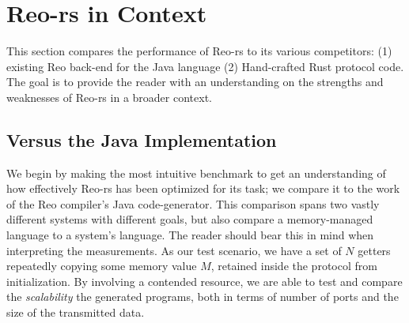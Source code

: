 \section{Reo-rs in Context}
This section compares the performance of Reo-rs to its various competitors: (1) existing Reo back-end for the Java language (2) Hand-crafted Rust protocol code. The goal is to provide the reader with an understanding on the strengths and weaknesses of Reo-rs in a broader context.

\subsection{Versus the Java Implementation}
We begin by making the most intuitive benchmark to get an understanding of how effectively Reo-rs has been optimized for its task; we compare it to the work of the Reo compiler's Java code-generator. This comparison spans two vastly different systems with different goals, but also compare a memory-managed language to a system's language. The reader should bear this in mind when interpreting the measurements. As our test scenario, we have a set of $N$ getters repeatedly copying some memory value $M$, retained inside the protocol from initialization. By involving a contended resource, we are able to test and compare the \textit{scalability} the generated programs, both in terms of number of ports and the size of the transmitted data.

